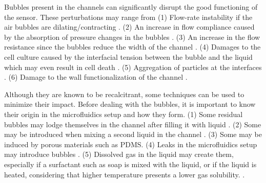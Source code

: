 Bubbles present in the channels can significantly disrupt the good functioning of the sensor. These perturbations may range from (1) Flow-rate instability if the air bubbles are dilating/contracting \cite{AirBubbles,bruus2011theoretical,Kang2010}. (2) An increase in flow compliance caused by the absorption of pressure changes in the bubbles \cite{AirBubbles,bruus2011theoretical}. (3) An increase in the flow resistance since the bubbles reduce the width of the channel \cite{AirBubbles}. (4) Damages to the cell culture caused by the interfacial tension between the bubble and the liquid which may even result in cell death \cite{AirBubbles,Kang2010}. (5) Aggregation of particles at the interfaces \cite{AirBubbles}. (6) Damage to the wall functionalization of the channel \cite{AirBubbles,Kang2010}. \par

Although they are known to be recalcitrant, some techniques can be used to minimize their impact.  Before dealing with the bubbles, it is important to know their origin in the microfluidics setup and how they form. (1) Some residual bubbles may lodge themselves in the channel after filling it with liquid \cite{bruus2011theoretical,AirBubbles}. (2) Some may be introduced when mixing a second liquid in the channel \cite{AirBubbles}. (3) Some may be induced by porous materials such as PDMS\cite{AirBubbles}. (4) Leaks in the microfluidics setup may introduce bubbles \cite{AirBubbles}. (5) Dissolved gas in the liquid may create them, especially if a surfactant such as soap is mixed with the liquid, or if the liquid is heated, considering that higher temperature presents a lower gas solubility. \cite{AirBubbles,Ufluidix}. \par

